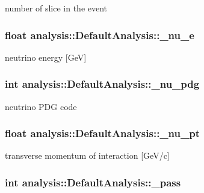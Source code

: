 number of slice in the event \hypertarget{classanalysis_1_1DefaultAnalysis_a41a1c23e4cb1a09e08024c7fa33572ce}{
\subsubsection[{\-\_\-nu\-\_\-e}]{\setlength{\rightskip}{0pt plus 5cm}float analysis\-::\-Default\-Analysis\-::\-\_\-nu\-\_\-e\hspace{0.3cm}{\ttfamily [private]}}}\label{classanalysis_1_1DefaultAnalysis_a41a1c23e4cb1a09e08024c7fa33572ce}
neutrino energy \mbox{[}Ge\-V\mbox{]} \hypertarget{classanalysis_1_1DefaultAnalysis_a625c353bb8912893b77a14f44d4f00b0}{
\subsubsection[{\-\_\-nu\-\_\-pdg}]{\setlength{\rightskip}{0pt plus 5cm}int analysis\-::\-Default\-Analysis\-::\-\_\-nu\-\_\-pdg\hspace{0.3cm}{\ttfamily [private]}}}\label{classanalysis_1_1DefaultAnalysis_a625c353bb8912893b77a14f44d4f00b0}
neutrino P\-D\-G code \hypertarget{classanalysis_1_1DefaultAnalysis_a901956985dfd610c781bedf7bfc9754a}{
\subsubsection[{\-\_\-nu\-\_\-pt}]{\setlength{\rightskip}{0pt plus 5cm}float analysis\-::\-Default\-Analysis\-::\-\_\-nu\-\_\-pt\hspace{0.3cm}{\ttfamily [private]}}}\label{classanalysis_1_1DefaultAnalysis_a901956985dfd610c781bedf7bfc9754a}
transverse momentum of interaction \mbox{[}Ge\-V/c\mbox{]} \hypertarget{classanalysis_1_1DefaultAnalysis_a8d58d05d4b0750a67babff41beece3ac}{
\subsubsection[{\-\_\-pass}]{\setlength{\rightskip}{0pt plus 5cm}int analysis\-::\-Default\-Analysis\-::\-\_\-pass\hspace{0.3cm}{\ttfamily [private]}}}\label{classanalysis_1_1DefaultAnalysis_a8d58d05d4b0750a67babff41beece3ac}
